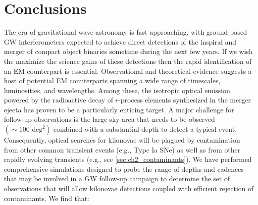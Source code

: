 \section{Conclusions}
\label{sec:ch2_conc}
The era of gravitational wave astronomy is fast approaching, with ground-based GW interferometers expected to achieve direct detections of the inspiral and merger of compact object binaries sometime during the next few years. If we wish the maximize the science gains of these detections then the rapid identification of an EM counterpart is essential.  Observational and theoretical evidence suggests a host of potential EM counterparts spanning a wide range of timescales, luminosities, and wavelengths. Among these, the isotropic optical emission powered by the radioactive decay of $r$-process elements synthesized in the merger ejecta has proven to be a particularly enticing target. A major challenge for follow-up observations is the large sky area that needs to be observed $(\sim100\text{ deg}^2)$ combined with a substantial depth to detect a typical event. Consequently, optical searches for kilonovae will be plagued by contamination from other common transient events (e.g., Type Ia SNe) as well as from other rapidly evolving transients (e.g., see \autoref{sec:ch2_contaminants}). We have performed comprehensive simulations designed to probe the range of depths and cadences that may be involved in a GW follow-up campaign to determine the set of observations that will allow kilonovae detections coupled with efficient rejection of contaminants. We find that:


